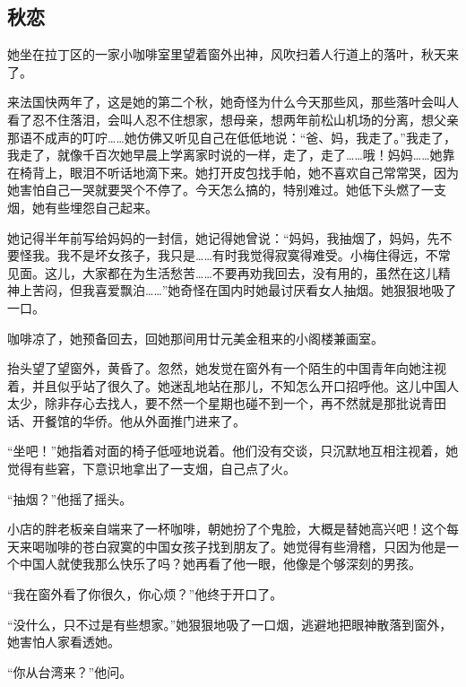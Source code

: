 \subsection{秋恋}

\par 她坐在拉丁区的一家小咖啡室里望着窗外出神，风吹扫着人行道上的落叶，秋天来了。
\par 来法国快两年了，这是她的第二个秋，她奇怪为什么今天那些风，那些落叶会叫人看了忍不住落泪，会叫人忍不住想家，想母亲，想两年前松山机场的分离，想父亲那语不成声的叮咛……她仿佛又听见自己在低低地说：“爸、妈，我走了。”我走了，我走了，就像千百次她早晨上学离家时说的一样，走了，走了……哦！妈妈……她靠在椅背上，眼泪不听话地滴下来。她打开皮包找手帕，她不喜欢自己常常哭，因为她害怕自己一哭就要哭个不停了。今天怎么搞的，特别难过。她低下头燃了一支烟，她有些埋怨自己起来。
\par 她记得半年前写给妈妈的一封信，她记得她曾说：“妈妈，我抽烟了，妈妈，先不要怪我。我不是坏女孩子，我只是……有时我觉得寂寞得难受。小梅住得远，不常见面。这儿，大家都在为生活愁苦……不要再劝我回去，没有用的，虽然在这儿精神上苦闷，但我喜爱飘泊……”她奇怪在国内时她最讨厌看女人抽烟。她狠狠地吸了一口。
\par 咖啡凉了，她预备回去，回她那间用廿元美金租来的小阁楼兼画室。
\par 抬头望了望窗外，黄昏了。忽然，她发觉在窗外有一个陌生的中国青年向她注视着，并且似乎站了很久了。她迷乱地站在那儿，不知怎么开口招呼他。这儿中国人太少，除非存心去找人，要不然一个星期也碰不到一个，再不然就是那批说青田话、开餐馆的华侨。他从外面推门进来了。
\par “坐吧！”她指着对面的椅子低哑地说着。他们没有交谈，只沉默地互相注视着，她觉得有些窘，下意识地拿出了一支烟，自己点了火。
\par “抽烟？”他摇了摇头。
\par 小店的胖老板亲自端来了一杯咖啡，朝她扮了个鬼脸，大概是替她高兴吧！这个每天来喝咖啡的苍白寂寞的中国女孩子找到朋友了。她觉得有些滑稽，只因为他是一个中国人就使我那么快乐了吗？她再看了他一眼，他像是个够深刻的男孩。
\par “我在窗外看了你很久，你心烦？”他终于开口了。
\par “没什么，只不过是有些想家。”她狠狠地吸了一口烟，逃避地把眼神散落到窗外，她害怕人家看透她。
\par “你从台湾来？”他问。

